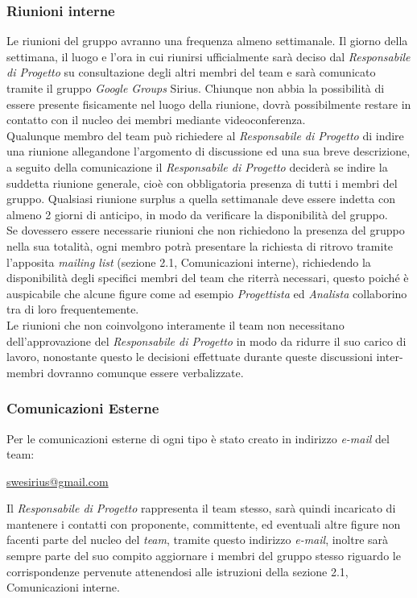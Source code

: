 \subsubsection{Riunioni interne}
Le riunioni del gruppo \gruppo{} avranno una frequenza almeno settimanale. Il giorno della settimana, il luogo e l'ora in cui riunirsi ufficialmente sarà deciso dal \textit{Responsabile di Progetto} su consultazione degli altri membri del team e sarà comunicato tramite il gruppo \textit{Google Groups} Sirius. Chiunque non abbia la possibilità di essere presente fisicamente nel luogo della riunione, dovrà possibilmente restare in contatto con il nucleo dei membri mediante videoconferenza.\\
Qualunque membro del team può richiedere al \textit{Responsabile di Progetto} di indire una riunione allegandone l'argomento di discussione ed una sua breve descrizione, a seguito della comunicazione il \textit{Responsabile di Progetto} deciderà se indire la suddetta riunione generale, cioè con obbligatoria presenza di tutti i membri del gruppo. Qualsiasi riunione surplus a quella settimanale deve essere indetta con almeno 2 giorni di anticipo, in modo da verificare la disponibilità del gruppo.\\
Se dovessero essere necessarie riunioni che non richiedono la presenza del gruppo nella sua totalità, ogni membro potrà presentare la richiesta di ritrovo tramite l'apposita \textit{mailing list} (sezione 2.1, Comunicazioni interne), richiedendo la disponibilità degli specifici membri del team che riterrà necessari, questo poiché è auspicabile che alcune figure come ad esempio \textit{Progettista} ed \textit{Analista} collaborino tra di loro frequentemente.\\
Le riunioni che non coinvolgono interamente il team non necessitano dell'approvazione del \textit{Responsabile di Progetto} in modo da ridurre il suo carico di lavoro, nonostante questo le decisioni effettuate durante queste discussioni inter-membri dovranno comunque essere verbalizzate.

\subsubsection{Comunicazioni Esterne}
Per le comunicazioni esterne di ogni tipo è stato creato in indirizzo \textit{e-mail} del team:
\begin{center}
\href{swesirius@gmail.com}{swesirius@gmail.com}
\end{center}

Il \textit{Responsabile di Progetto} rappresenta il team stesso, sarà quindi incaricato di mantenere i contatti con proponente, committente, ed eventuali altre figure non facenti parte del nucleo del \textit{team}, tramite questo indirizzo \textit{e-mail}, inoltre sarà sempre parte del suo compito aggiornare i membri del gruppo stesso riguardo le corrispondenze pervenute attenendosi alle istruzioni della sezione 2.1, Comunicazioni interne.

